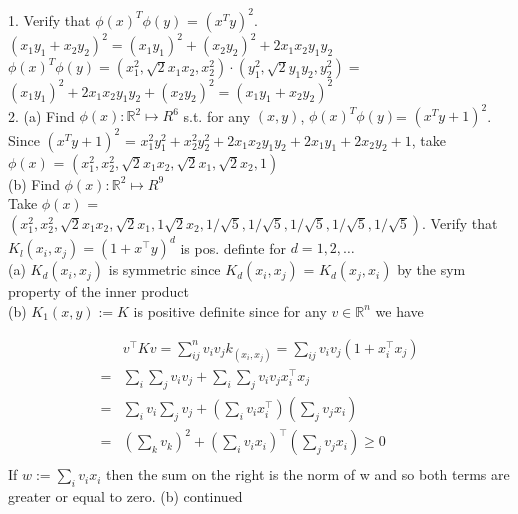 \documentclass[18pt]{article}
\author{Adam Handwerger}
\begin{document}
\\
\newline
{}\\
\begin{flushleft}
1. Verify that $\phi(x)^T\phi(y)$ = $(x^Ty)^2$.\\
\vspace{.5cm}
$(x_1y_1 + x_2y_2)^2 = (x_1y_1)^2 + (x_2y_2)^2 + 2x_1x_2y_1y_2$\\
\vspace{.5cm}
$\phi(x)^T\phi(y) = (x_1^2, \sqrt2 x_1x_2, x_2^2) \cdot (y_1^2, \sqrt2 y_1y_2, y_2^2)=$\\
$(x_1y_1)^2 + 2x_1x_2y_1y_2 + (x_2y_2)^2 = (x_1y_1 + x_2y_2)^2$\\
\vspace{.5cm}
2. (a) Find $\phi(x):\mathbb{R}^2 \mapsto {R}^6$ s.t. for any $(x,y)$, $ \phi(x)^T\phi(y)$=
$(x^Ty+1)^2$.\\
\vspace{.5cm}
Since $(x^Ty+1)^2$ = $x_{1}^2y_1^2+x_2^2y_2^2+2x_1x_2y_1y_2+2x_1y_1+2x_2y_2+1$, take\\
$\phi(x)$ = $(x_1^2,x_2^2,\sqrt{2}x_1x_2,\sqrt{2} x_1,\sqrt{2} x_2 ,1)$\\
\vspace{.5cm}
(b) Find $\phi(x):\mathbb{R}^2 \mapsto {R}^9$\\
\vspace{.5cm}
Take $\phi(x)$ =\\
$(x_1^2,x_2^2,\sqrt{2}x_1x_2,\sqrt{2} x_1,1\sqrt{2}x_2 ,1/ \sqrt{5},1/ \sqrt{5},1/ \sqrt{5},1/ \sqrt{5},1/ \sqrt{5})$.
\vspace{.5cm}
Verify that $K_{l}(x_i, x_j)=\left(1+x^{\top} y\right)^{d}$ is pos. definte for $d=1,2, \ldots$\\
\vspace{.5cm}
(a) $K_{d}(x_i,x_j)$ is symmetric since $K_{d}(x_i,x_j)$ = $K_{d}(x_j, x_i)$ by the sym property of the inner product\\
\vspace{.5cm}
(b) $K_{1}(x, y) :=K$ is positive definite since for any $v\in \mathbb{R}^{n}$ we have

$$
\begin{aligned}
&v^{\top} K v=\sum_{i j}^n v_{i} v_{j} k_(x_i,x_j)=\sum_{i j} v_{i} v_{j}\left(1+x_{i}^{\top} x_{j}\right) \\
= & \sum_{i} \sum_{j} v_{i} v_{j}+\sum_{i} \sum_{j} v_{i} v_{j} x_{i}^{\top} x_{j} \\
= & \sum_{i} v_{i} \sum_{j} v_{j}+\left(\sum_{i} v_{i} x_{i}^{\top}\right)\left(\sum_{j} v_{j} x_{i}\right) \\
= & \left(\sum_{k} v_{k}\right)^{2}+\left(\sum_{i} v_{i} x_{i}\right)^{\top}\left(\sum_{j} v_{j} x_{i}\right)  \geqslant 0\\
\end{aligned}
$$
If $w:=\sum_{i} v_{i} x_{i}$ then the sum on the right is the norm of w and so both terms are greater or equal to zero. 
\pagebreak
(b) continued


\end{flushleft}
\end{document}
